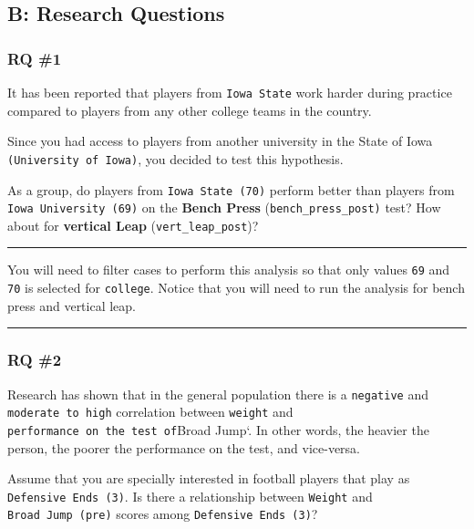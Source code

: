 \documentclass[
]{article}
\begin{document}
\hypertarget{appendix-b}{%
\subsection{B: Research Questions}\label{appendix-b}}

\hypertarget{rq-1}{%
\subsubsection{RQ \#1}\label{rq-1}}

It has been reported that players from \texttt{Iowa\ State} work harder during practice compared to players from any other college teams in the country.

Since you had access to players from another university in the State of Iowa \texttt{(University\ of\ Iowa)}, you decided to test this hypothesis.

As a group, do players from \texttt{Iowa\ State\ (70)} perform better than players from \texttt{Iowa\ University\ (69)} on the \textbf{Bench Press} (\texttt{bench\_press\_post)} test? How about for \textbf{vertical Leap} (\texttt{vert\_leap\_post})?

\begin{center}\rule{0.5\linewidth}{0.5pt}\end{center}

You will need to filter cases to perform this analysis so that only values \texttt{69} and \texttt{70} is selected for \texttt{college}. Notice that you will need to run the analysis for bench press and vertical leap.

\begin{center}\rule{0.5\linewidth}{0.5pt}\end{center}

\hypertarget{rq-2}{%
\subsubsection{RQ \#2}\label{rq-2}}

Research has shown that in the general population there is a \texttt{negative} and \texttt{moderate\ to\ high} correlation between \texttt{weight} and \texttt{performance\ on\ the\ test\ of}Broad Jump`. In other words, the heavier the person, the poorer the performance on the test, and vice-versa.

Assume that you are specially interested in football players that play as \texttt{Defensive\ Ends\ (3)}. Is there a relationship between \texttt{Weight} and \texttt{Broad\ Jump\ (pre)} scores among \texttt{Defensive\ Ends\ (3)}?
\end{document}
